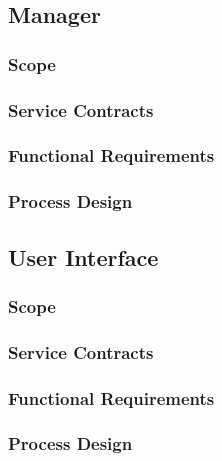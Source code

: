 \documentclass[11pt]{article}
\begin{document}
\subsection{Manager}
\subsubsection{Scope}
\subsubsection{Service Contracts}
\subsubsection{Functional Requirements}
\subsubsection{Process Design}

\subsection{User Interface}
\subsubsection{Scope}
\subsubsection{Service Contracts}
\subsubsection{Functional Requirements}
\subsubsection{Process Design}
\end{document}
